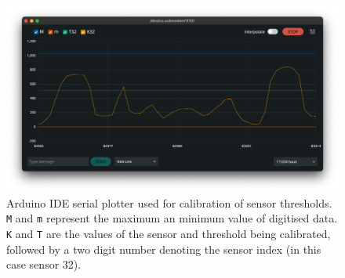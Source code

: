 \begin{figure}
    \centering
    \includegraphics[width=\linewidth]{src/images/serial_monitor.png}
    \caption{Arduino IDE serial plotter used for calibration of sensor thresholds. \texttt{M} and \texttt{m} represent the maximum an minimum value of digitised data. \texttt{K} and \texttt{T} are the values of the sensor and threshold being calibrated, followed by a two digit number denoting the sensor index (in this case sensor 32).}
    \label{fig:serial_monitor}
\end{figure}






